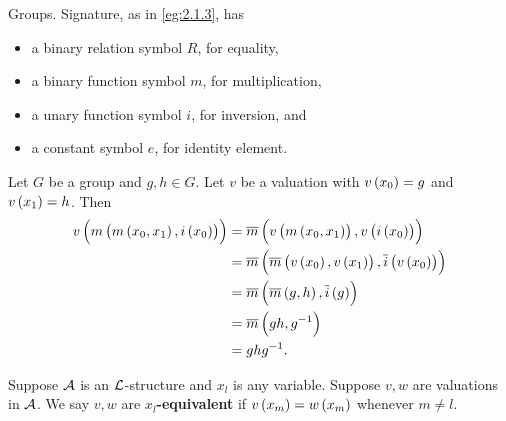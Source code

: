 \begin{example*}
Groups. Signature, as in \ref{eg:2.1.3}, has
\begin{itemize}
\item a binary relation symbol $ R $, for equality,
\item a binary function symbol $ m $, for multiplication,
\item a unary function symbol $ i $, for inversion, and
\item a constant symbol $ e $, for identity element.
\end{itemize}
Let $ G $ be a group and $ g, h \in G $. Let $ v $ be a valuation with $ v\br{x_0} = g $ and $ v\br{x_1} = h $. Then
\begin{align*}
v\br{m\br{m\br{x_0, x_1}, i\br{x_0}}}
& = \overline{m}\br{v\br{m\br{x_0, x_1}}, v\br{i\br{x_0}}} \\
& = \overline{m}\br{\overline{m}\br{v\br{x_0}, v\br{x_1}}, \overline{i}\br{v\br{x_0}}} \\
& = \overline{m}\br{\overline{m}\br{g, h}, \overline{i}\br{g}} \\
& = \overline{m}\br{gh, g^{-1}} \\
& = ghg^{-1}.
\end{align*}
\end{example*}

\begin{definition}
Suppose $ \AA $ is an $ \LL $-structure and $ x_l $ is any variable. Suppose $ v, w $ are valuations in $ \AA $. We say $ v, w $ are \textbf{$ x_l $-equivalent} if $ v\br{x_m} = w\br{x_m} $ whenever $ m \ne l $.
\end{definition}

\pagebreak

